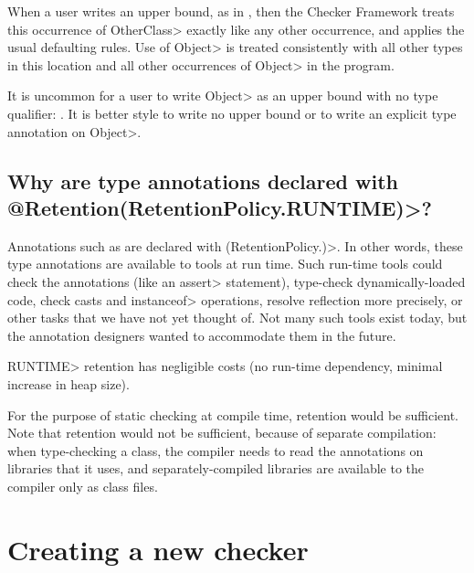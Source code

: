 When a user writes an upper bound, as in
,
then the Checker Framework treats this occurrence of \<OtherClass> exactly
like any other occurrence, and applies the usual defaulting rules.  Use of
\<Object> is treated consistently with all other types in this location and
all other occurrences of \<Object> in the program.

It is uncommon for a user to write \<Object> as an upper bound with no type
qualifier:
.
It is better style to write no upper bound or to write an explicit type
annotation on \<Object>.


\subsection{Why are type annotations declared with \<@Retention(RetentionPolicy.RUNTIME)>?\label{faq-runtime-retention}}

Annotations such as  are
declared with
\<(RetentionPolicy.)>.  In other words,
these type annotations are available to tools at run time.  Such run-time
tools could check the annotations (like an \<assert> statement), type-check
dynamically-loaded code, check casts and \<instanceof> operations, resolve
reflection more precisely, or other tasks that we have not yet thought of.
Not many such tools exist today, but the annotation designers wanted to
accommodate them in the future.

\<RUNTIME> retention has negligible costs (no run-time dependency, minimal
increase in heap size).

For the purpose of static checking at compile time,
retention would be sufficient.  Note that
retention would not be sufficient, because of separate compilation: when
type-checking a class, the compiler needs to read the annotations on
libraries that it uses, and separately-compiled libraries are available to
the compiler only as class files.


\section{Creating a new checker\label{faq-create-a-checker-section}}

